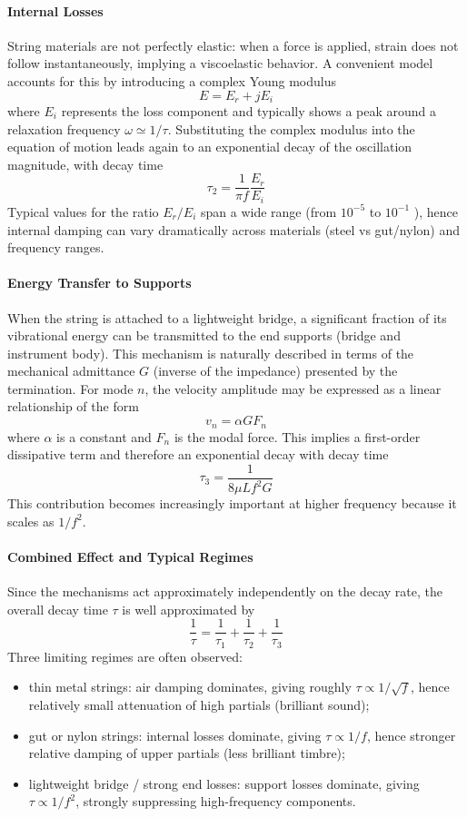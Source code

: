\paragraph{Internal Losses} String materials are not perfectly elastic: when a force is applied, strain does not follow instantaneously, implying a viscoelastic behavior. A convenient model accounts for this by introducing a complex Young modulus
\[
E = E_r + j E_i
\]
where \( E_i \) represents the loss component and typically shows a peak around a relaxation frequency \( \omega\simeq 1/\tau \). Substituting the complex modulus into the equation of motion leads again to an exponential decay of the oscillation magnitude, with decay time
\[
\tau_2 = \frac{1}{\pi f}\frac{E_r}{E_i}
\]
Typical values for the ratio \( E_r/E_i \) span a wide range (from \( 10^{-5} \) to \( 10^{-1} \) ), hence internal damping can vary dramatically across materials (steel vs gut/nylon) and frequency ranges. 

\paragraph{Energy Transfer to Supports} When the string is attached to a lightweight bridge, a significant fraction of its vibrational energy can be transmitted to the end supports (bridge and instrument body). This mechanism is naturally described in terms of the mechanical admittance \( G \) (inverse of the impedance) presented by the termination. For mode \( n \), the velocity amplitude may be expressed as a linear relationship of the form
\[
v_n = \alpha GF_n
\]
where \( \alpha \) is a constant and \( F_n \) is the modal force. This implies a first-order dissipative term and therefore an exponential decay with decay time
\[
\tau_3 = \frac{1}{8\mu L f^{2}G}
\]
This contribution becomes increasingly important at higher frequency because it scales as \( 1/f^2 \).

\paragraph{Combined Effect and Typical Regimes} Since the mechanisms act approximately independently on the decay rate, the overall decay time \( \tau \) is well approximated by
\[
\frac{1}{\tau} = \frac{1}{\tau_1} + \frac{1}{\tau_2} + \frac{1}{\tau_3}
\]
Three limiting regimes are often observed:

\begin{itemize}
    \item thin metal strings: air damping dominates, giving roughly \( \tau \propto 1/\sqrt{f} \), hence relatively small attenuation of high partials (brilliant sound);
    \item gut or nylon strings: internal losses dominate, giving \( \tau \propto 1/f \), hence stronger relative damping of upper partials (less brilliant timbre);
    \item lightweight bridge / strong end losses: support losses dominate, giving \( \tau \propto 1/f^{2} \), strongly suppressing high-frequency components.
\end{itemize}

